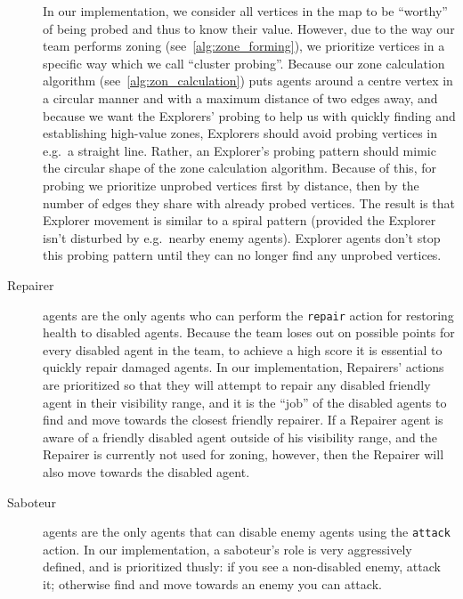 \begin{description}
        In our implementation, we consider all vertices in the map to be \enquote{worthy} of being probed and thus to know their value.
        However, due to the way our team performs zoning (see~\autoref{alg:zone_forming}), we prioritize vertices in a specific way which we call \enquote{cluster probing}.
        Because our zone calculation algorithm (see~\autoref{alg:zon_calculation}) puts agents around a centre vertex in a circular manner and with a maximum distance of two edges away, and because we want the Explorers' probing to help us with quickly finding and establishing high-value zones, Explorers should avoid probing vertices in e.g.\ a straight line.
        Rather, an Explorer's probing pattern should mimic the circular shape of the zone calculation algorithm.
        Because of this, for probing we prioritize unprobed vertices first by distance, then by the number of edges they share with already probed vertices.
        The result is that Explorer movement is similar to a spiral pattern (provided the Explorer isn't disturbed by e.g.\ nearby enemy agents).
        Explorer agents don't stop this probing pattern until they can no longer find any unprobed vertices.
    \item[Repairer] agents are the only agents who can perform the \texttt{repair} action for restoring health to disabled agents.
        Because the team loses out on possible points for every disabled agent in the team, to achieve a high score it is essential to quickly repair damaged agents.
        In our implementation, Repairers' actions are prioritized so that they will attempt to repair any disabled friendly agent in their visibility range, and it is the \enquote{job} of the disabled agents to find and move towards the closest friendly repairer.
        If a Repairer agent is aware of a friendly disabled agent outside of his visibility range, and the Repairer is currently not used for zoning, however, then the Repairer will also move towards the disabled agent.
    \item[Saboteur] agents are the only agents that can disable enemy agents using the \texttt{attack} action.
        In our implementation, a saboteur's role is very aggressively defined, and is prioritized thusly: if you see a non-disabled enemy, attack it; otherwise find and move towards an enemy you can attack.
        

\end{description}
